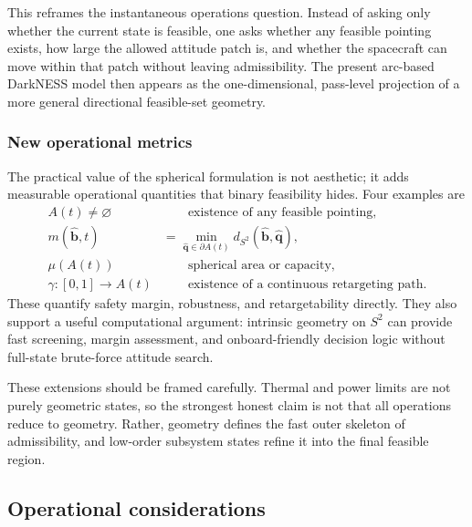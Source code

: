 \documentclass[preprint,12pt]{elsarticle}
\theoremstyle{definition}
\theoremstyle{remark}
\begin{document}
This reframes the instantaneous operations question.
Instead of asking only whether the current state is feasible, one asks whether any feasible pointing exists, how large the allowed attitude patch is, and whether the spacecraft can move within that patch without leaving admissibility.
The present arc-based DarkNESS model then appears as the one-dimensional, pass-level projection of a more general directional feasible-set geometry.

\subsubsection{New operational metrics}

The practical value of the spherical formulation is not aesthetic; it adds measurable operational quantities that binary feasibility hides.
Four examples are
\begin{align}
A(t)\neq \varnothing &\qquad \text{existence of any feasible pointing,} \\
m(\hat{\mathbf{b}},t) &= \min_{\hat{\mathbf{q}}\in\partial A(t)} d_{S^2}\!\left(\hat{\mathbf{b}},\hat{\mathbf{q}}\right), \label{eq:margin_s2}\\
\mu\!\left(A(t)\right) &\qquad \text{spherical area or capacity,} \\
\gamma:[0,1]\to A(t) &\qquad \text{existence of a continuous retargeting path.}
\end{align}
These quantify safety margin, robustness, and retargetability directly.
They also support a useful computational argument: intrinsic geometry on $S^2$ can provide fast screening, margin assessment, and onboard-friendly decision logic without full-state brute-force attitude search.

These extensions should be framed carefully.
Thermal and power limits are not purely geometric states, so the strongest honest claim is not that all operations reduce to geometry.
Rather, geometry defines the fast outer skeleton of admissibility, and low-order subsystem states refine it into the final feasible region.

\subsection{Operational considerations}
\end{document}
